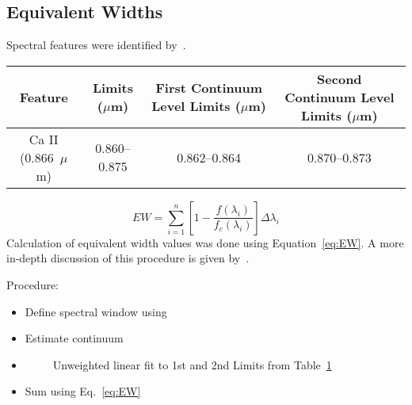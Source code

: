 \subsection{Equivalent Widths}


Spectral features were identified by~\cite{Rayner_2009}.  

\begin{table}[H]
	\begin{tabular}{c|c|c|c}
	\label{tab:features}
		Feature & Limits ($\mu$m) & First Continuum Level Limits ($\mu$m) & Second Continuum Level Limits ($\mu$m) \\ \hline
		Ca II (0.866~$\mu$m) & 0.860--0.875 & 0.862--0.864 & 0.870--0.873 \\
	\end{tabular}
\end{table}

\begin{equation}\label{eq:EW}
	EW = \sum_{i=1}^{n} [1 - \frac{f(\lambda_{i})}{f_{c}(\lambda_{i})}] \Delta\lambda_{i}
\end{equation}
Calculation of equivalent width values was done using Equation~\ref{eq:EW}.  A more in-depth discussion of this procedure is given by~\cite{Cushing_2005}.

Procedure:\\
\begin{itemize}
	\item{} Define spectral window using
	\item{} Estimate continuum
	\item{}~~~~~Unweighted linear fit to 1st and 2nd Limits from Table~\ref{tab:features}
	\item{} Sum using Eq.~\ref{eq:EW}
\end{itemize}

